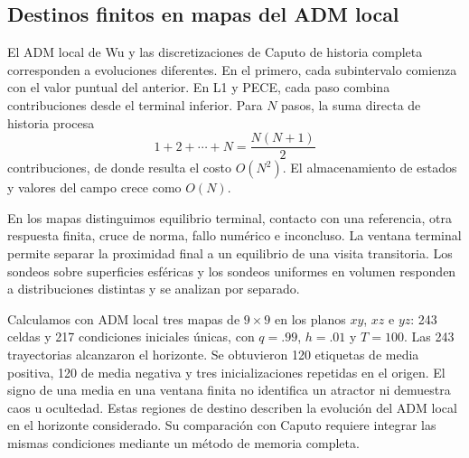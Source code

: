 \subsection{Destinos finitos en mapas del ADM local}

El ADM local de Wu y las discretizaciones de Caputo de historia completa
corresponden a evoluciones diferentes. En el primero, cada subintervalo
comienza con el valor puntual del anterior. En L1 y PECE, cada paso combina
contribuciones desde el terminal inferior. Para \(N\) pasos, la suma directa
de historia procesa
\[
 1+2+\cdots+N=\frac{N(N+1)}2
\]
contribuciones, de donde resulta el costo \(O(N^2)\). El almacenamiento
de estados y valores del campo crece como \(O(N)\).

En los mapas distinguimos equilibrio terminal, contacto con una referencia,
otra respuesta finita, cruce de norma, fallo numérico e inconcluso. La
ventana terminal permite separar la proximidad final a un equilibrio de
una visita transitoria. Los sondeos sobre superficies esféricas y los
sondeos uniformes en volumen responden a distribuciones distintas y se
analizan por separado.

Calculamos con ADM local tres mapas de $9\times9$
en los planos $xy$, $xz$ e $yz$: 243 celdas y 217 condiciones iniciales
únicas, con $q=.99$, $h=.01$ y $T=100$. Las 243 trayectorias alcanzaron
el horizonte. Se obtuvieron 120 etiquetas de media positiva, 120 de media
negativa y tres inicializaciones repetidas en el origen. El signo de una
media en una ventana finita no identifica un atractor ni demuestra caos
u ocultedad. Estas regiones de destino describen la evolución del ADM local en el
horizonte considerado. Su comparación con Caputo requiere integrar las
mismas condiciones mediante un método de memoria completa.

